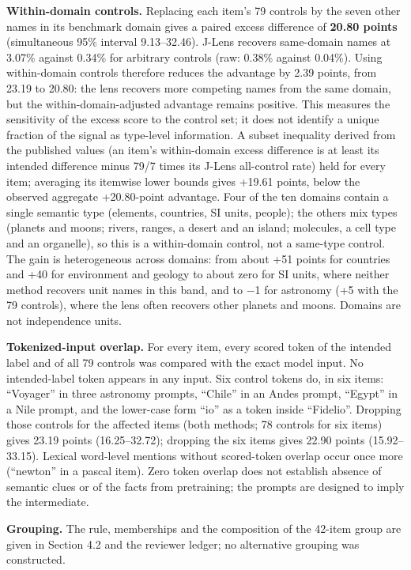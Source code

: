 \textbf{Within-domain controls.} Replacing each item's 79 controls by
the seven other names in its benchmark domain gives a paired excess
difference of \textbf{20.80 points} (simultaneous 95\% interval
9.13--32.46). J-Lens recovers same-domain names at 3.07\% against 0.34\%
for arbitrary controls (raw: 0.38\% against 0.04\%). Using within-domain
controls therefore reduces the advantage by 2.39 points, from 23.19 to
20.80: the lens recovers more competing names from the same domain, but
the within-domain-adjusted advantage remains positive. This measures the
sensitivity of the excess score to the control set; it does not identify
a unique fraction of the signal as type-level information. A subset
inequality derived from the published values (an item's within-domain
excess difference is at least its intended difference minus 79/7 times
its J-Lens all-control rate) held for every item; averaging its itemwise
lower bounds gives +19.61 points, below the observed aggregate
+20.80-point advantage. Four of the ten domains contain a single
semantic type (elements, countries, SI units, people); the others mix
types (planets and moons; rivers, ranges, a desert and an island;
molecules, a cell type and an organelle), so this is a within-domain
control, not a same-type control. The gain is heterogeneous across
domains: from about +51 points for countries and +40 for environment and
geology to about zero for SI units, where neither method recovers unit
names in this band, and to −1 for astronomy (+5 with the 79 controls),
where the lens often recovers other planets and moons. Domains are not
independence units.

\textbf{Tokenized-input overlap.} For every item, every scored token of
the intended label and of all 79 controls was compared with the exact
model input. No intended-label token appears in any input. Six control
tokens do, in six items: ``Voyager'' in three astronomy prompts,
``Chile'' in an Andes prompt, ``Egypt'' in a Nile prompt, and the
lower-case form ``io'' as a token inside ``Fidelio''. Dropping those
controls for the affected items (both methods; 78 controls for six
items) gives 23.19 points (16.25--32.72); dropping the six items gives
22.90 points (15.92--33.15). Lexical word-level mentions without
scored-token overlap occur once more (``newton'' in a pascal item). Zero
token overlap does not establish absence of semantic clues or of the
facts from pretraining; the prompts are designed to imply the
intermediate.

\textbf{Grouping.} The rule, memberships and the composition of the
42-item group are given in Section 4.2 and the reviewer ledger; no
alternative grouping was constructed.

